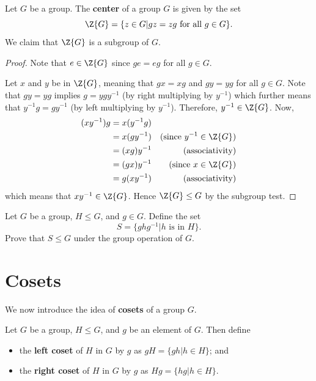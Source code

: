 \begin{example}\label{example-center-of-group}
    Let $G$ be a group. The \textbf{center} of a group $G$ is given by the set
    \[
        \Z{G} = \{z \in G \vert gz = zg \text{ for all } g \in G\}.
    \]
    We claim that $\Z{G}$ is a subgroup of $G$.

    \begin{proof}
	    Note that $e \in \Z{G}$ since $ge = eg$ for all $g \in G$.

	    Let $x$ and $y$ be in $\Z{G}$, meaning that $gx = xg$ and $gy = yg$ for all $g \in G$. Note that $gy = yg$ implies $g = ygy^{-1}$ (by right multiplying by $y^{-1}$) which further means that $y^{-1}g = gy^{-1}$ (by left multiplying by $y^{-1}$). Therefore, $y^{-1} \in \Z{G}$. Now,
	    \begin{align*}
	        (xy^{-1})g &= x(y^{-1}g)\\
	        &= x(gy^{-1}) & (\text{since } y^{-1} \in \Z{G})\\
	        &= (xg)y^{-1} & (\text{associativity})\\
	        &= (gx)y^{-1} & (\text{since } x \in \Z{G})\\
	        &= g(xy^{-1}) & (\text{associativity})
	    \end{align*}
	    which means that $xy^{-1} \in \Z{G}$. Hence $\Z{G} \leq G$ by the subgroup test.
    \end{proof}
\end{example}

\begin{exercise}\label{exercise-conjugate-subgroup}
    Let $G$ be a group, $H \leq G$, and $g \in G$. Define the set
    \[
        S = \{ghg^{-1} \vert h \text{ is in } H\}.
    \]
    Prove that $S \leq G$ under the group operation of $G$.
\end{exercise}

\newpage

\section{Cosets}
We now introduce the idea of \textbf{cosets} of a group $G$.
\begin{definition}
    Let $G$ be a group, $H \leq G$, and $g$ be an element of $G$. Then define
    \begin{itemize}
        \item the \textbf{left coset} of $H$ in $G$ by $g$ as $gH = \{gh \vert h \in H\}$; and
        \item the \textbf{right coset} of $H$ in $G$ by $g$ as $Hg = \{hg \vert h \in H\}$.
    \end{itemize}
\end{definition}

